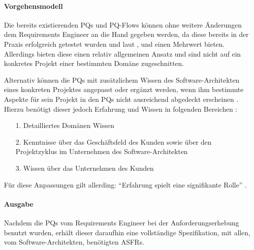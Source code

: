 \paragraph{Vorgehensmodell} \label{probing_model}

Die bereits existierenden PQs und PQ-Flows k\"onnen ohne weitere \"Anderungen dem Requirements Engineer an die Hand gegeben werden, da diese bereits in der Praxis erfolgreich getestet wurden und laut \cite{Ros01}, \cite{Ros02} und \cite{Ros03} einen Mehrwert bieten. Allerdings bieten diese einen relativ allgemeinen Ansatz und sind nicht auf ein konkretes Projekt einer bestimmten Dom\"ane zugeschnitten. 

Alternativ k\"onnen die PQs mit zus\"atzlichem Wissen des Software-Architekten eines konkreten Projektes angepasst oder erg\"anzt werden, wenn ihm bestimmte Aspekte f\"ur sein Projekt in den PQs nicht ausreichend abgedeckt erscheinen \cite{Ros02}. Hierzu ben\"otigt dieser jedoch Erfahrung und Wissen in folgenden Bereichen \cite{Ros02}: \\

\begin{itemize}
\item[1.] Detailliertes Dom\"anen Wissen
\item[2.] Kenntnisse \"uber das Gesch\"aftsfeld des Kunden sowie \"uber den Projektzyklus im Unternehmen des Software-Architekten
\item[3.] Wissen \"uber das Unternehmen des Kunden
\end{itemize}

F\"ur diese Anpassungen gilt allerding: ``Erfahrung spielt eine signifikante Rolle'' \cite{Ros02}. \\

\paragraph{Ausgabe}

Nachdem die PQs vom Requirements Engineer bei der Anforderungserhebung benutzt wurden, erh\"alt dieser daraufhin eine vollst\"andige Spezifikation, mit allen, vom Software-Architekten, ben\"otigten ASFRs. \\

